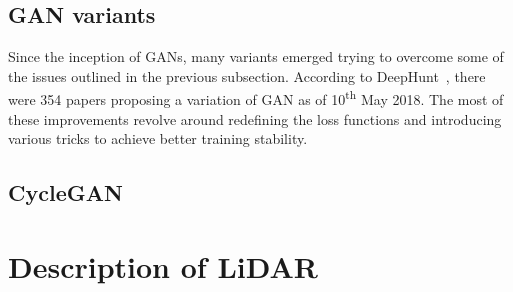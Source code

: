 \subsection{GAN variants}

Since the inception of GANs, many variants emerged trying to overcome some of the issues outlined in the previous subsection. According to DeepHunt~\cite{deephunt}, there were 354 papers proposing a variation of GAN as of 10\textsuperscript{th} May 2018. The most of these improvements revolve around redefining the loss functions and introducing various tricks to achieve better training stability.

\subsection{CycleGAN} \label{cyclegan}

\section{Description of LiDAR}
